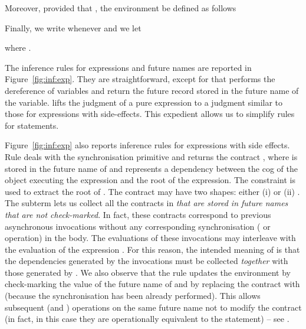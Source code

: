 Moreover, provided that ,
the environment
  be defined as follows 


Finally, we write  whenever  and we let 

where .


\medskip

The inference rules for expressions and future names are reported in 
Figure~\ref{fig:inf:exp}. They are straightforward, except for  that performs the dereference of variables and return 
the future record stored in the future name of the variable. 
lifts the judgment of a pure expression to a judgment similar to those for
expressions with side-effects. This expedient allows us to simplify rules for
statements.

\smallskip

Figure~\ref{fig:inf:exp} also reports inference rules for expressions with 
side effects. Rule  
deals with the  synchronisation primitive and returns the contract
 , where  is 
 stored in the 
future name of  and  represents a dependency between the cog of the  object executing 
the expression and the root of the expression. The constraint  
is used to extract the root  of . The contract  may have two shapes: either 
(i)  or (ii) .
The subterm  lets us collect 
all the contracts in  
\emph{that are 
stored in future names that are not check-marked}. In fact, these contracts
correspond to previous asynchronous invocations without any corresponding 
synchronisation 
( or  operation) in the body. The evaluations of these invocations
may interleave with the evaluation of the expression . For this reason,
the intended meaning of  is that the
dependencies generated by the invocations must be collected \emph{together} with
those generated by .
We also observe that the rule updates the 
environment by check-marking the value of the future name of  and by replacing the
contract with  (because the synchronisation has been already performed). 
This allows subsequent
 (and ) operations on the same future name not to modify the contract
(in fact, in this case they are operationally equivalent to the  statement)
-- see . 

